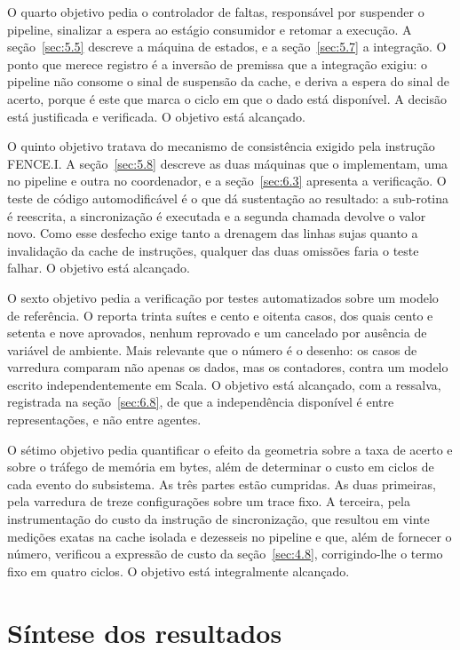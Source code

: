 O quarto objetivo pedia o controlador de faltas, responsável por suspender o pipeline, sinalizar a espera ao estágio consumidor e retomar a execução. A seção~\ref{sec:5.5} descreve a máquina de estados, e a seção~\ref{sec:5.7} a integração. O ponto que merece registro é a inversão de premissa que a integração exigiu: o pipeline não consome o sinal de suspensão da cache, e deriva a espera do sinal de acerto, porque é este que marca o ciclo em que o dado está disponível. A decisão está justificada e verificada. O objetivo está alcançado.

O quinto objetivo tratava do mecanismo de consistência exigido pela instrução FENCE.I. A seção~\ref{sec:5.8} descreve as duas máquinas que o implementam, uma no pipeline e outra no coordenador, e a seção~\ref{sec:6.3} apresenta a verificação. O teste de código automodificável é o que dá sustentação ao resultado: a sub-rotina é reescrita, a sincronização é executada e a segunda chamada devolve o valor novo. Como esse desfecho exige tanto a drenagem das linhas sujas quanto a invalidação da cache de instruções, qualquer das duas omissões faria o teste falhar. O objetivo está alcançado.

O sexto objetivo pedia a verificação por testes automatizados sobre um modelo de referência. O  reporta trinta suítes e cento e oitenta casos, dos quais cento e setenta e nove aprovados, nenhum reprovado e um cancelado por ausência de variável de ambiente. Mais relevante que o número é o desenho: os casos de varredura comparam não apenas os dados, mas os contadores, contra um modelo escrito independentemente em Scala. O objetivo está alcançado, com a ressalva, registrada na seção~\ref{sec:6.8}, de que a independência disponível é entre representações, e não entre agentes.

O sétimo objetivo pedia quantificar o efeito da geometria sobre a taxa de acerto e sobre o tráfego de memória em bytes, além de determinar o custo em ciclos de cada evento do subsistema. As três partes estão cumpridas. As duas primeiras, pela varredura de treze configurações sobre um trace fixo. A terceira, pela instrumentação do custo da instrução de sincronização, que resultou em vinte medições exatas na cache isolada e dezesseis no pipeline e que, além de fornecer o número, verificou a expressão de custo da seção~\ref{sec:4.8}, corrigindo-lhe o termo fixo em quatro ciclos. O objetivo está integralmente alcançado.

\section{Síntese dos resultados}\label{sec:7.2}

